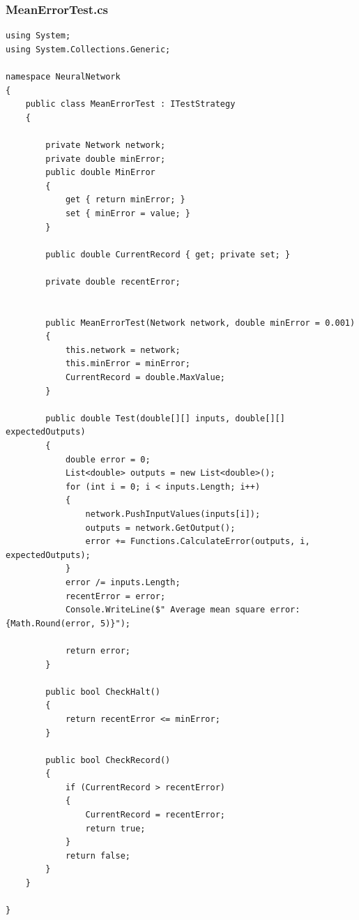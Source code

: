 \documentclass[12pt,a4paper]{article}
\begin{document}
\subsubsection*{MeanErrorTest.cs}
\begin{lstlisting}
using System;
using System.Collections.Generic;

namespace NeuralNetwork
{
    public class MeanErrorTest : ITestStrategy
    {

        private Network network;
        private double minError;
        public double MinError
        {
            get { return minError; }
            set { minError = value; }
        }

        public double CurrentRecord { get; private set; }

        private double recentError;


        public MeanErrorTest(Network network, double minError = 0.001)
        {
            this.network = network;
            this.minError = minError;
            CurrentRecord = double.MaxValue;
        }

        public double Test(double[][] inputs, double[][] expectedOutputs)
        {
            double error = 0;
            List<double> outputs = new List<double>();
            for (int i = 0; i < inputs.Length; i++)
            {
                network.PushInputValues(inputs[i]);
                outputs = network.GetOutput();
                error += Functions.CalculateError(outputs, i, expectedOutputs);
            }
            error /= inputs.Length;
            recentError = error;
            Console.WriteLine($" Average mean square error: {Math.Round(error, 5)}");

            return error;
        }

        public bool CheckHalt()
        {
            return recentError <= minError;
        }

        public bool CheckRecord()
        {
            if (CurrentRecord > recentError)
            {
                CurrentRecord = recentError;
                return true;
            }
            return false;
        }
    }

}\end{lstlisting}
\pagebreak
\end{document}
